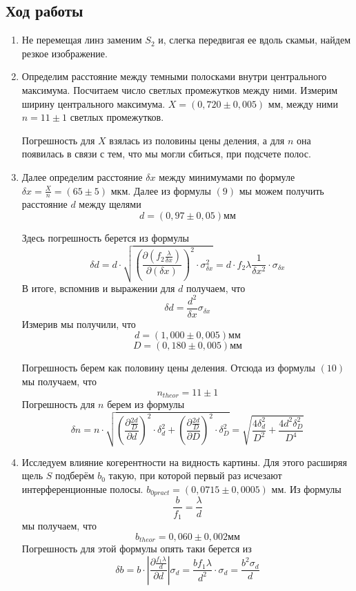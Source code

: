 \documentclass[a4paper, 12pt]{article}%
\begin{document}
\subsection*{Ход работы}
\begin{enumerate}
\item Не перемещая линз заменим $S_2$ и, слегка передвигая ее вдоль скамьи, найдем резкое изображение.
\item Определим расстояние между темными полосками внутри центрального максимума. Посчитаем число светлых промежутков между ними. Измерим ширину центрального максимума. $X = (0,720 \pm 0,005)$ мм, между ними $n = 11 \pm 1$ светлых промежутков.

Погрешность для $X$ взялась из половины цены деления, а для $n$ она появилась в связи с тем, что мы могли сбиться, при подсчете полос.
\item Далее определим расстояние $\delta x$ между минимумами по формуле $\delta x = \frac{X}{n} = (65 \pm 5)$ мкм. Далее из формулы $(9)$ мы можем получить расстояние $d$ между щелями
\[d = (0,97 \pm 0,05) \text{мм}\]

Здесь погрешность берется из формулы
\[\delta d = d \cdot \sqrt{\left(\dfrac{\partial \left(f_2 \frac{\lambda}{\delta x}  \right)}{\partial \left(\delta x\right)}\right)^{2} \cdot \sigma_{\delta x}^2} = d \cdot f_2\lambda \dfrac{1}{\delta x^2} \cdot \sigma_{\delta x}\]
В итоге, вспомнив и выражении для $d$ получаем, что 
\[\delta d = \dfrac{d^2}{\delta x} \sigma_{\delta x}\]
Измерив мы получили, что 
\[d = (1,000 \pm 0,005) \text{мм}\]
\[D = (0,180 \pm 0,005) \text{мм}\]

Погрешность берем как половину цены деления.
Отсюда из формулы $(10)$ мы получаем, что
\[n_{theor} = 11 \pm 1\]
Погрешность для $n$ берем из формулы 
\[\delta n = n \cdot \sqrt{\left(\dfrac{\partial \frac{2d}{D}}{\partial d}\right)^{2} \cdot \delta_{d}^2 + \left(\dfrac{\partial \frac{2d}{D}}{\partial D}\right)^{2} \cdot \delta_{D}^2} = \sqrt{\dfrac{4\delta_d^2}{D^2} + \dfrac{4d^2\delta_{D}^2}{D^4}}\]
\item Исследуем влияние когерентности на видность картины. Для этого расширяя щель $S$ подберём $b_0$ такую, при которой первый раз исчезают интерференционные полосы. $b_{0pract} = (0,0715 \pm 0,0005)$ мм. Из формулы 
\[\dfrac{b}{f_1} = \dfrac{\lambda}{d}\]
мы получаем, что 
\[b_{theor} = 0,060 \pm 0,002 \text{мм}\]
Погрешность для этой формулы опять таки берется из
\[\delta b = b \cdot \left|\dfrac{\partial \frac{f_1 \lambda}{d}}{\partial d}\right| \sigma_d = \dfrac{b f_1 \lambda}{d^2} \cdot \sigma_d = \dfrac{b^2\sigma_d}{d}\]
\end{enumerate}
\end{document}
